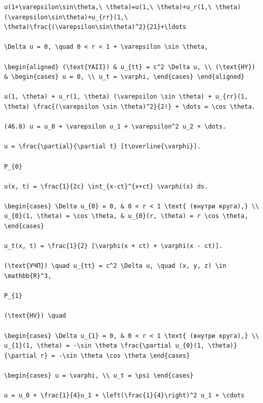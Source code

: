 \documentclass[
  ukrainian,
]{article}
\begin{document}
\begin{verbatim}
u(1+\varepsilon\sin\theta,\ \theta)=u(1,\ \theta)+u_r(1,\ \theta)(\varepsilon\sin\theta)+u_{rr}(1,\ \theta)\frac{(\varepsilon\sin\theta)^2}{21}+\ldots

\Delta u = 0, \quad 0 < r < 1 + \varepsilon \sin \theta,

\begin{aligned} (\text{YAII}) & u_{tt} = c^2 \Delta u, \\ (\text{HY}) & \begin{cases} u = 0, \\ u_t = \varphi, \end{cases} \end{aligned}

u(1, \theta) + u_r(1, \theta) (\varepsilon \sin \theta) + u_{rr}(1, \theta) \frac{(\varepsilon \sin \theta)^2}{2!} + \dots = \cos \theta.

(46.8) u = u_0 + \varepsilon u_1 + \varepsilon^2 u_2 + \dots.

u = \frac{\partial}{\partial t} [t\overline{\varphi}].

P_{0}

u(x, t) = \frac{1}{2c} \int_{x-ct}^{x+ct} \varphi(s) ds.

\begin{cases} \Delta u_{0} = 0, & 0 < r < 1 \text{ (внутри круга),} \\ u_{0}(1, \theta) = \cos \theta, & u_{0}(r, \theta) = r \cos \theta, \end{cases}

u_t(x, t) = \frac{1}{2} [\varphi(x + ct) + \varphi(x - ct)].

(\text{УЧП}) \quad u_{tt} = c^2 \Delta u, \quad (x, y, z) \in \mathbb{R}^3,

P_{1}

(\text{HV}) \quad

\begin{cases} \Delta u_{1} = 0, & 0 < r < 1 \text{ (внутри круга),} \\ u_{1}(1, \theta) = -\sin \theta \frac{\partial u_{0}(1, \theta)}{\partial r} = -\sin \theta \cos \theta \end{cases}

\begin{cases} u = \varphi, \\ u_t = \psi \end{cases}

u = u_0 + \frac{1}{4}u_1 + \left(\frac{1}{4}\right)^2 u_1 + \cdots
\end{verbatim}
\end{document}
